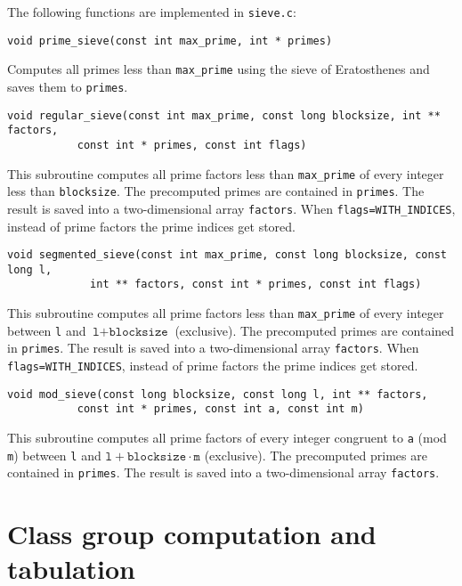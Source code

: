 \documentclass[a4paper,10pt]{article}
\newcommand{\code}{\lstinline}
\begin{document}
The following functions are implemented in \code{sieve.c}:

\begin{lstlisting}
void prime_sieve(const int max_prime, int * primes)
\end{lstlisting}

Computes all primes less than \code{max_prime} using the sieve of Eratosthenes and saves them to \code{primes}.

\begin{lstlisting}
void regular_sieve(const int max_prime, const long blocksize, int ** factors,
		   const int * primes, const int flags)
\end{lstlisting}

This subroutine computes all prime factors less than \code{max_prime} of every integer less than \code{blocksize}. The precomputed primes are contained in \code{primes}. The result is saved into a two-dimensional array \code{factors}. When \code{flags=WITH_INDICES}, instead of prime factors the prime indices get stored.

\begin{lstlisting}
void segmented_sieve(const int max_prime, const long blocksize, const long l,
		     int ** factors, const int * primes, const int flags)
\end{lstlisting}

This subroutine computes all prime factors less than \code{max_prime} of every integer between \code{l} and \mbox{$\texttt{l} + \texttt{blocksize}$} (exclusive). The precomputed primes are contained in \code{primes}. The result is saved into a two-dimensional array \code{factors}. When \code{flags=WITH_INDICES}, instead of prime factors the prime indices get stored.

\begin{lstlisting}
void mod_sieve(const long blocksize, const long l, int ** factors,
	       const int * primes, const int a, const int m)
\end{lstlisting}

This subroutine computes all prime factors of every integer congruent to \code{a} (mod \code{m}) between \code{l} and \mbox{$\texttt{l} + \texttt{blocksize} \cdot \texttt{m}$} (exclusive). The precomputed primes are contained in \code{primes}. The result is saved into a two-dimensional array \code{factors}.





\section{Class group computation and tabulation} \label{subsec:clgrp}
\end{document}
